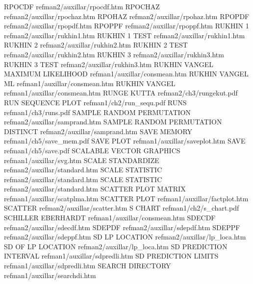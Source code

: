 RPOCDF                                  refman2/auxillar/rpocdf.htm
RPOCHAZ                                 refman2/auxillar/rpochaz.htm
RPOHAZ                                  refman2/auxillar/rpohaz.htm
RPOPDF                                  refman2/auxillar/rpopdf.htm
RPOPPF                                  refman2/auxillar/rpoppf.htm
RUKHIN 1                                refman2/auxillar/rukhin1.htm
RUKHIN 1 TEST                           refman2/auxillar/rukhin1.htm
RUKHIN 2                                refman2/auxillar/rukhin2.htm
RUKHIN 2 TEST                           refman2/auxillar/rukhin2.htm
RUKHIN 3                                refman2/auxillar/rukhin3.htm
RUKHIN 3 TEST                           refman2/auxillar/rukhin3.htm
RUKHIN VANGEL MAXIMUM LIKELIHOOD        refman1/auxillar/consmean.htm
RUKHIN VANGEL ML                        refman1/auxillar/consmean.htm
RUKHIN VANGEL                           refman1/auxillar/consmean.htm
RUNGE KUTTA                             refman2/ch3/rungekut.pdf
RUN SEQUENCE PLOT                       refman1/ch2/run_sequ.pdf
RUNS                                    refman1/ch3/runs.pdf
SAMPLE RANDOM PERMUTATION               refman2/auxillar/samprand.htm
SAMPLE RANDOM PERMUTATION DISTINCT      refman2/auxillar/samprand.htm
SAVE MEMORY                             refman1/ch5/save_mem.pdf
SAVE PLOT                               refman1/auxillar/saveplot.htm
SAVE                                    refman1/ch5/save.pdf
SCALABLE VECTOR GRAPHICS                refman1/auxillar/svg.htm
SCALE STANDARDIZE                       refman2/auxillar/standard.htm
SCALE STATISTIC                         refman2/auxillar/standard.htm
SCALE STATISTIC                         refman2/auxillar/standard.htm
SCATTER PLOT MATRIX                     refman1/auxillar/scatplma.htm
SCATTER PLOT                            refman1/auxillar/factplot.htm
SCATTER                                 refman2/auxillar/scatter.htm
S CHART                                 refman1/ch2/s_chart.pdf
SCHILLER EBERHARDT                      refman1/auxillar/consmean.htm
SDECDF                                  refman2/auxillar/sdecdf.htm
SDEPDF                                  refman2/auxillar/sdepdf.htm
SDEPPF                                  refman2/auxillar/sdeppf.htm
SD LP LOCATION                          refman2/auxillar/lp_loca.htm
SD OF LP LOCATION                       refman2/auxillar/lp_loca.htm
SD PREDICTION INTERVAL                  refman1/auxillar/sdpredli.htm
SD PREDICTION LIMITS                    refman1/auxillar/sdpredli.htm
SEARCH DIRECTORY                        refman1/auxillar/searchdi.htm
